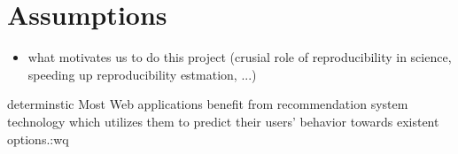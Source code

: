 \section{Assumptions}
\begin{tcolorbox}
	\begin{itemize}
		\item what motivates us to do this project (crusial role of 
		reproducibility in science, speeding up reproducibility estmation, ...)
\end{itemize}
\end{tcolorbox}

determinstic
Most Web applications benefit from recommendation system technology which utilizes them to predict their users' behavior towards existent options.:wq

   \cite{Sample}
